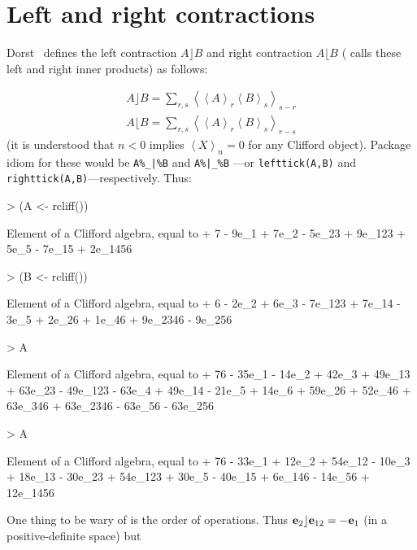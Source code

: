 \documentclass{birkjour}
\theoremstyle{definition}
\theoremstyle{remark}
\numberwithin{equation}{section}
\renewenvironment{Schunk}{\vspace{20pt}}{\vspace{20pt}}
\begin{document}
\section{Left and right contractions}

Dorst~\cite{dorst2002} defines the left contraction $A\rfloor B$ and
right contraction $A\lfloor B$ (\cite{chisolm2012} calls these left
and right inner products) as follows:

\begin{eqnarray}
\displaystyle A\rfloor B = \sum_{r,s}\left\langle\left\langle
A\right\rangle_r\left\langle B\right\rangle_s\right\rangle_{s-r}\\
\displaystyle A\lfloor B = \sum_{r,s}\left\langle\left\langle
A\right\rangle_r\left\langle B\right\rangle_s\right\rangle_{r-s}
\end{eqnarray}
%
(it is understood that $n<0$ implies $\left\langle
  X\right\rangle_n=0$ for any Clifford object).
Package idiom for these would be {\tt A\%\_|\%B} and {\tt A\%|\_\%B}
---or {\tt lefttick(A,B)} and {\tt righttick(A,B)}---respectively.
Thus:

\begin{Schunk}
\begin{Sinput}
> (A <- rcliff())
\end{Sinput}
\begin{Soutput}
Element of a Clifford algebra, equal to
+ 7 - 9e_1 + 7e_2 - 5e_23 + 9e_123 + 5e_5 - 7e_15 + 2e_1456
\end{Soutput}
\begin{Sinput}
> (B <- rcliff())
\end{Sinput}
\begin{Soutput}
Element of a Clifford algebra, equal to
+ 6 - 2e_2 + 6e_3 - 7e_123 + 7e_14 - 3e_5 + 2e_26 + 1e_46 +
9e_2346 - 9e_256
\end{Soutput}
\begin{Sinput}
> A %
\end{Sinput}
\begin{Soutput}
Element of a Clifford algebra, equal to
+ 76 - 35e_1 - 14e_2 + 42e_3 + 49e_13 + 63e_23 - 49e_123 - 63e_4 +
49e_14 - 21e_5 + 14e_6 + 59e_26 + 52e_46 + 63e_346 + 63e_2346 -
63e_56 - 63e_256
\end{Soutput}
\begin{Sinput}
> A %
\end{Sinput}
\begin{Soutput}
Element of a Clifford algebra, equal to
+ 76 - 33e_1 + 12e_2 + 54e_12 - 10e_3 + 18e_13 - 30e_23 + 54e_123 +
30e_5 - 40e_15 + 6e_146 - 14e_56 + 12e_1456
\end{Soutput}
\end{Schunk}
%
One thing to be wary of is the order of operations.  Thus
${\bf e}_{2}\rfloor{\bf e}_{12}=-{\bf e}_{1}$ (in a positive-definite space) but
\end{document}

